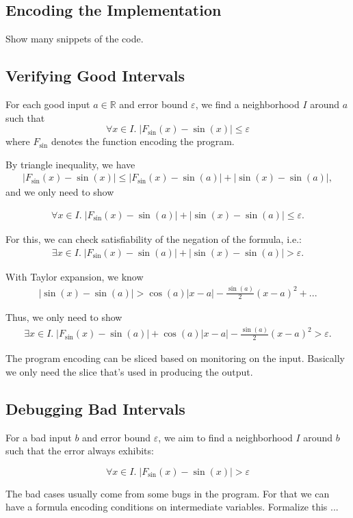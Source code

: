 \subsection{Encoding the Implementation}

Show many snippets of the code.


\subsection{Verifying Good Intervals}

For each good input $a\in \mathbb{R}$ and error bound $\varepsilon$,
we find a neighborhood $I$ around $a$ such that
$$\forall x\in I.\; |F_{\sin}(x)-\sin(x)|\leq \varepsilon$$
where $F_{\sin}$ denotes the function encoding the program.

By triangle inequality, we have
\begin{eqnarray}
|F_{\sin}(x) - \sin(x)| \leq |F_{\sin}(x) - \sin(a)| + |\sin(x) - \sin(a)|,
\end{eqnarray}
and we only need to show

\begin{eqnarray}
\forall x\in I.\; |F_{\sin}(x) - \sin(a)| + |\sin(x) - \sin(a)| \leq \varepsilon.
\end{eqnarray}

For this, we can check satisfiability of the negation of the formula, i.e.:
\begin{eqnarray}
\exists x\in I.\; |F_{\sin}(x) - \sin(a)| + |\sin(x) - \sin(a)| > \varepsilon.
\end{eqnarray}

With Taylor expansion, we know
\begin{eqnarray}
|\sin(x) - \sin(a)| > \cos(a) |x - a| - \frac{\sin(a)}{2}(x-a)^2 + ... %
\end{eqnarray}

Thus, we only need to show
\begin{eqnarray}
\exists x\in I.\; |F_{\sin}(x) - \sin(a)| + \cos(a) |x - a| -
\frac{\sin(a)}{2}(x-a)^2 > \varepsilon.
\end{eqnarray}

The program encoding can be sliced based on monitoring on the input.
Basically we only need the slice that's used in producing the output.

\subsection{Debugging Bad Intervals}

For a bad input $b$ and error bound $\varepsilon$, we aim to find a
neighborhood $I$ around $b$ such that the error always exhibits:

$$ \forall x\in I.\; |F_{\sin}(x) - \sin(x)| > \varepsilon$$

The bad cases usually come from some bugs in the program. For that we
can have a formula encoding conditions on intermediate variables.
Formalize this ...

